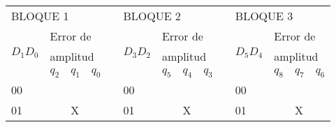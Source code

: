 \begin{table}[]
\begin{tabular}{|llll|l|llll|l|llll|}
\cline{1-4} \cline{6-9} \cline{11-14}
\multicolumn{4}{|l|}{BLOQUE 1}                                                                                       &  & \multicolumn{4}{l|}{BLOQUE 2}                                                                                         &  & \multicolumn{4}{l|}{BLOQUE 3}                                                                                        \\ \cline{1-4} \cline{6-9} \cline{11-14} 
\multicolumn{1}{|l|}{\multirow{3}{*}{$ D_1 D_0 $}} & \multicolumn{3}{l|}{Error de}                                   &  & \multicolumn{1}{l|}{\multirow{3}{*}{$ D_3 D_2 $}} & \multicolumn{3}{l|}{Error de}                                     &  & \multicolumn{1}{l|}{\multirow{3}{*}{$ D_5 D_4 $}} & \multicolumn{3}{l|}{Error de}                                    \\
\multicolumn{1}{|l|}{}                             & \multicolumn{3}{l|}{amplitud}                                   &  & \multicolumn{1}{l|}{}                             & \multicolumn{3}{l|}{amplitud}                                     &  & \multicolumn{1}{l|}{}                             & \multicolumn{3}{l|}{amplitud}                                    \\ \cline{2-4} \cline{7-9} \cline{12-14} 
\multicolumn{1}{|l|}{}                             & \multicolumn{1}{l|}{$q_2$} & \multicolumn{1}{l|}{$q_1$} & $q_0$ &  & \multicolumn{1}{l|}{}                             & \multicolumn{1}{l|}{$ q_5 $} & \multicolumn{1}{l|}{$q_4$} & $q_3$ &  & \multicolumn{1}{l|}{}                             & \multicolumn{1}{l|}{$q_8 $} & \multicolumn{1}{l|}{$q_7$} & $q_6$ \\ \cline{1-4} \cline{6-9} \cline{11-14} 
\multicolumn{1}{|l|}{00}                           & \multicolumn{1}{l|}{}      & \multicolumn{1}{l|}{}      &       &  & \multicolumn{1}{l|}{00}                           & \multicolumn{1}{l|}{}        & \multicolumn{1}{l|}{}      &       &  & \multicolumn{1}{l|}{00}                           & \multicolumn{1}{l|}{}       & \multicolumn{1}{l|}{}      &       \\ \cline{1-4} \cline{6-9} \cline{11-14} 
\multicolumn{1}{|l|}{01}                           & \multicolumn{1}{l|}{}      & \multicolumn{1}{l|}{X}     &       &  & \multicolumn{1}{l|}{01}                           & \multicolumn{1}{l|}{}        & \multicolumn{1}{l|}{X}     &       &  & \multicolumn{1}{l|}{01}                           & \multicolumn{1}{l|}{}       & \multicolumn{1}{l|}{X}     &       \\ \cline{1-4} \cline{6-9} \cline{11-14} 

\end{tabular}
\end{table}
